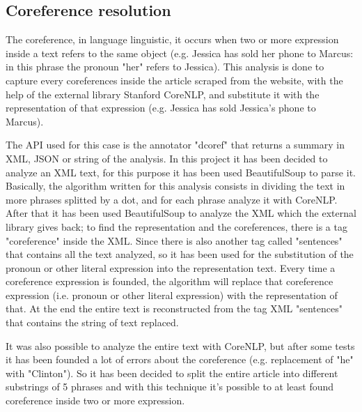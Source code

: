 \subsection{Coreference resolution}
The coreference, in language linguistic, it occurs when two or more expression inside a text refers to the same object (e.g. Jessica has sold her phone to Marcus: in this phrase the pronoun "her" refers to Jessica). 
This analysis is done to capture every coreferences inside the article scraped from the website, with the help of the external library Stanford CoreNLP, and substitute it with the representation of that expression (e.g. Jessica has sold Jessica's phone to Marcus).
\par
The API used for this case is the annotator "dcoref" that returns a summary in XML, JSON or string of the analysis. In this project it has been decided to analyze an XML text, for this purpose it has been used BeautifulSoup to parse it. 
Basically, the algorithm written for this analysis consists in dividing the text in more phrases splitted by a dot, and for each phrase analyze it with CoreNLP. 
After that it has been used BeautifulSoup to analyze the XML which the external library gives back; to find the representation and the coreferences, there is a tag "coreference" inside the XML. 
Since there is also another tag called "sentences" that contains all the text analyzed, so it has been used for the substitution of the pronoun or other literal expression into the representation text. 
Every time a coreference expression is founded, the algorithm will replace that coreference expression (i.e. pronoun or other literal expression) with the representation of that. 
At the end the entire text is reconstructed from the tag XML "sentences" that contains the string of text replaced.
\par
It was also possible to analyze the entire text with CoreNLP, but after some tests it has been founded a lot of errors about the coreference (e.g. replacement of "he" with "Clinton"). 
So it has been decided to split the entire article into different substrings of 5 phrases and with this technique it's possible to at least found coreference inside two or more expression. 

